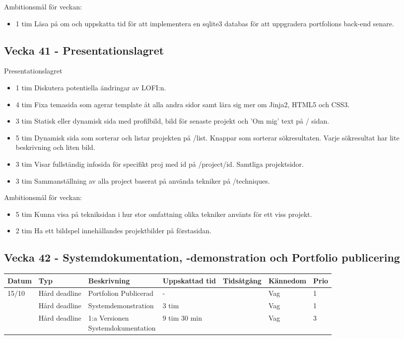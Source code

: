 \documentclass{TDP003mall}
\begin{document}
Ambitionsmål för veckan:
\begin{itemize}
\item 1 tim Läsa på om och uppskatta tid för att implementera en sqlite3 databas för att uppgradera portfolions back-end senare.
  \end{itemize}

\subsection*{Vecka 41 - Presentationslagret}

Presentationslagret
\begin{itemize}
  \item 1 tim Diskutera potentiella ändringar av LOFI:n. 
  \item 4 tim Fixa temasida som agerar template åt alla andra sidor samt lära sig mer om Jinja2, HTML5 och CSS3.
  \item 3 tim Statisk eller dynamisk sida med profilbild, bild för senaste projekt och 'Om mig' text på / sidan.
  \item 5 tim Dynamisk sida som sorterar och listar projekten på /list. Knappar som sorterar sökresultaten. Varje sökresultat har lite beskrivning och liten bild.                  
  \item 3 tim Visar fullständig infosida för specifikt proj med id på /project/id. Samtliga projektsidor.
  \item 3 tim Sammanställning av alla project baserat på använda tekniker på /techniques.
\end{itemize}

Ambitionsmål för veckan:
\begin{itemize}
\item 5 tim Kunna visa på tekniksidan i hur stor omfattning olika tekniker använts för ett viss projekt.
\item 2 tim Ha ett bildspel innehållandes projektbilder på förstasidan.
\end{itemize}

\subsection*{Vecka 42 - Systemdokumentation, -demonstration och Portfolio publicering}
\begin{tabularx}{\linewidth}{|l|l|X|l|l|l|l|}
	\hline
	Datum & Typ           & Beskrivning                       & Uppskattad tid & Tidsåtgång & Kännedom & Prio \\ [0.5ex]
	\hline                                             
        15/10 & Hård deadline & Portfolion Publicerad             & -              &            & Vag      & 1    \\
	\hline                                             
          & Hård deadline & Systemdemonstration               & 3 tim             &            & Vag      & 1    \\
	\hline                                             
          & Hård deadline  & \makecell[tl]{1:a Versionen\\Systemdokumentation} & 9 tim 30 min             &            & Vag      & 3    \\
	\hline
\end{tabularx}
\end{document}
